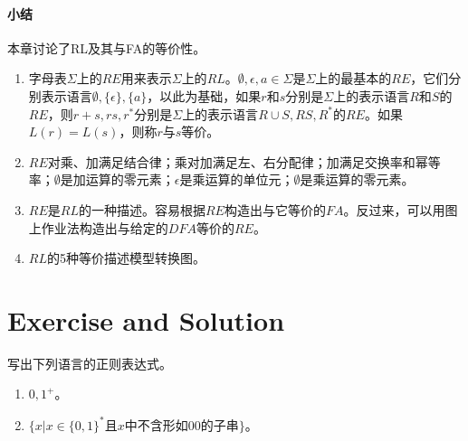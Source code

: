 \paragraph{小结}
本章讨论了RL及其与FA的等价性。
\begin{enumerate}
	\item 字母表$\Sigma$上的$RE$用来表示$\Sigma$上的$RL$。$\emptyset,\epsilon,a\in\Sigma$是$\Sigma$上的最基本的$RE$，它们分别表示语言$\emptyset,\{\epsilon\},\{a\}$，以此为基础，如果$r$和$s$分别是$\Sigma$上的表示语言$R$和$S$的$RE$，则$r+s,rs,r^\ast$分别是$\Sigma$上的表示语言$R\cup S,RS,R^\ast$的$RE$。如果$L(r)=L(s)$，则称$r$与$s$等价。  
	\item $RE$对乘、加满足结合律；乘对加满足左、右分配律；加满足交换率和幂等率；$\emptyset$是加运算的零元素；$\epsilon$是乘运算的单位元；$\emptyset$是乘运算的零元素。
	\item $RE$是$RL$的一种描述。容易根据$RE$构造出与它等价的$FA$。反过来，可以用图上作业法构造出与给定的$DFA$等价的$RE$。
	\item $RL$的5种等价描述模型转换图。  
\end{enumerate}

\section{Exercise and Solution}
\begin{exercise}
	写出下列语言的正则表达式。
	\begin{enumerate}
		\item ${0,1}^+$。
		\item $\{x|x\in \{0,1\}^\ast \text{且$x$中不含形如$00$的子串}\}$。
	\end{enumerate}	
\end{exercise}

